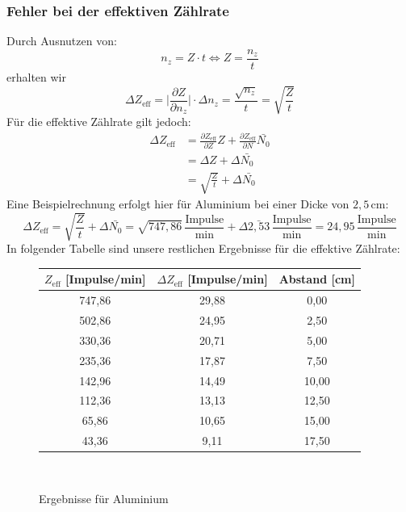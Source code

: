 \documentclass[fontsize=12pt]{scrartcl}
\begin{document}
\subsubsection{Fehler bei der effektiven Zählrate}
Durch Ausnutzen von:
\begin{equation*}
n_z = Z \cdot t \Longleftrightarrow Z= \frac{n_z}{t}
\end{equation*}
erhalten wir
\begin{equation*}
\Delta Z_{\text{eff}}= \vert \frac{\partial Z}{\partial n_z}\vert \cdot \Delta n_z =\frac{ \sqrt{n_z} }{t} = \sqrt{\frac{Z}{t}}
\end{equation*}
Für die effektive Zählrate gilt jedoch:
\begin{align*}
\Delta Z_{\text{eff}} &=\frac{\partial Z_{\text{eff}}}{\partial Z} Z + \frac{\partial Z_{\text{eff}}}{\partial N}\bar{N_0} \\
&=\Delta Z + \Delta \bar{N_0} \\
&= \sqrt{\frac{Z}{t}} + \Delta \bar{N_0} 
\end{align*}
Eine Beispielrechnung erfolgt hier für Aluminium bei einer Dicke von $2,5$\,cm:
\begin{equation*}
\Delta Z_{\text{eff}} = \sqrt{\frac{Z}{t}} + \Delta \bar{N_0} = \sqrt{747,86}\,\frac{\text{Impulse}}{\text{min}} + \Delta \bar{2,53}\,\frac{\text{Impulse}}{\text{min}} =24,95 \,\frac{\text{Impulse}}{\text{min}}
\end{equation*}
\noindent
In folgender Tabelle sind unsere restlichen Ergebnisse für die effektive Zählrate:
\begin{figure}[h!]
\centering
\caption{Ergebnisse  für Aluminium}
\begin{tabular}{|c|c|c|} \hline
$Z_{\text{eff}}$ [Impulse/min] & $\Delta Z_{\text{eff}}$ [Impulse/min]	&Abstand [cm] \\ \hline
747,86	&29,88	&0,00\\ \hline
502,86	&24,95	&2,50\\ \hline
330,36	&20,71	&5,00\\ \hline
235,36	&17,87	&7,50\\ \hline
142,96	&14,49	&10,00\\ \hline
112,36	&13,13	&12,50\\ \hline
65,86	&10,65	&15,00\\ \hline
43,36	&9,11		&17,50\\ \hline
\end{tabular} \\
\end{figure}
\end{document}
